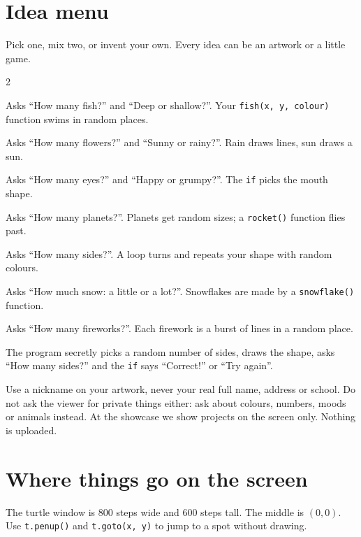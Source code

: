 \documentclass[level=1]{kidscode}
\begin{document}
\section{Idea menu}
Pick one, mix two, or invent your own. Every idea can be an artwork or a little game.

\begin{multicols}{2}
\begin{description}[leftmargin=0pt,itemsep=4pt,font=\bfseries]
  \item[Underwater world] Asks \enquote{How many fish?} and \enquote{Deep or shallow?}. Your \texttt{fish(x, y, colour)} function swims in random places.
  \item[Flower garden] Asks \enquote{How many flowers?} and \enquote{Sunny or rainy?}. Rain draws lines, sun draws a sun.
  \item[Monster maker] Asks \enquote{How many eyes?} and \enquote{Happy or grumpy?}. The \texttt{if} picks the mouth shape.
  \item[Space trip] Asks \enquote{How many planets?}. Planets get random sizes; a \texttt{rocket()} function flies past.
  \item[Kaleidoscope] Asks \enquote{How many sides?}. A loop turns and repeats your shape with random colours.
  \item[Snow day] Asks \enquote{How much snow: a little or a lot?}. Snowflakes are made by a \texttt{snowflake()} function.
  \item[Fireworks show] Asks \enquote{How many fireworks?}. Each firework is a burst of lines in a random place.
  \item[Guess-the-shape game] The program secretly picks a random number of sides, draws the shape, asks \enquote{How many sides?} and the \texttt{if} says \enquote{Correct!} or \enquote{Try again}.
\end{description}
\end{multicols}

\begin{safety}
Use a nickname on your artwork, never your real full name, address or school.
Do not ask the viewer for private things either: ask about colours, numbers, moods or animals instead.
At the showcase we show projects on the screen only. Nothing is uploaded.
\end{safety}

\section{Where things go on the screen}
The turtle window is 800 steps wide and 600 steps tall. The middle is $(0, 0)$.
Use \texttt{t.penup()} and \texttt{t.goto(x, y)} to jump to a spot without drawing.
\end{document}
